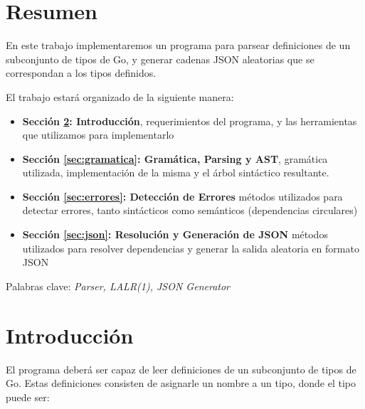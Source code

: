 \section{Resumen}

En este trabajo implementaremos un programa para parsear definiciones de un subconjunto de tipos de Go, y generar cadenas JSON aleatorias que se correspondan a los tipos definidos.

El trabajo estará organizado de la siguiente manera:

\begin{itemize}
	\item \textbf{Sección \ref{sec:intro}: Introducción}, requerimientos del programa, y las herramientas que utilizamos para implementarlo
	\item \textbf{Sección \ref{sec:gramatica}: Gramática, Parsing y AST}, gramática utilizada, implementación de la misma y el árbol sintáctico resultante.
	\item \textbf{Sección \ref{sec:errores}: Detección de Errores} métodos utilizados para detectar errores, tanto sintácticos como semánticos (dependencias circulares)
	\item \textbf{Sección \ref{sec:json}: Resolución y Generación de JSON} métodos utilizados para resolver dependencias y generar la salida aleatoria en formato JSON
\end{itemize}

Palabras clave: \textit{Parser, LALR(1), JSON Generator}

\newpage

\section{Introducción}
\label{sec:intro}

El programa deberá ser capaz de leer definiciones de un subconjunto de tipos de Go. Estas definiciones consisten de asignarle un nombre a un tipo, donde el tipo puede ser:

